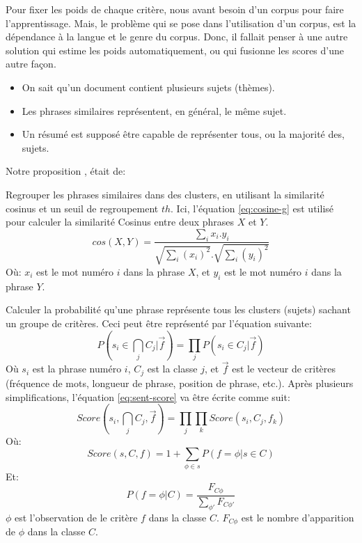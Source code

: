 \documentclass[12pt, oneside, a4paper]{book}
\begin{document}
Pour fixer les poids de chaque critère, nous avant besoin d'un corpus pour faire l'apprentissage.
Mais, le problème qui se pose dans l'utilisation d'un corpus, est la dépendance à la langue et le genre du corpus.
Donc, il fallait penser à une autre solution qui estime les poids automatiquement, ou qui fusionne les scores d'une autre façon.
\begin{itemize}
\item On sait qu'un document contient plusieurs sujets (thèmes).
\item Les phrases similaires représentent, en général, le même sujet.
\item Un résumé est supposé être capable de représenter tous, ou la majorité des, sujets.
\end{itemize}
Notre proposition \cite{13-aries-al}, était de:

\noindent
Regrouper les phrases similaires dans des clusters, en utilisant la similarité cosinus et un seuil de regroupement $ th $.
Ici, l'équation \ref{eq:cosine-g} est utilisé pour calculer la similarité Cosinus entre deux phrases $ X $ et $ Y $.
\begin{equation}
\label{eq:cosine-g}
cos(X,Y) = \frac {\sum_i {x_i.y_i} }
{\sqrt{\sum_i(x_i)^2} . \sqrt{\sum_i(y_i)^2}}
\end{equation}
Où: $ x_i $ est le mot numéro $ i $ dans la phrase $ X $, et $ y_i $ est le mot numéro $ i $ dans la phrase $ Y $.

\noindent
Calculer la probabilité qu'une phrase représente tous les clusters (sujets) sachant un groupe de critères.
Ceci peut être représenté par l'équation suivante: 
\begin{equation}
\label{eq:sent-score}
P(s_i \in \bigcap_{j} C_j | \overrightarrow{f}) = 
\prod_{j} P(s_i \in C_j | \overrightarrow{f})
\end{equation}
Où $s_i$ est la phrase numéro $i$, $C_j$ est la classe $j$, et $\overrightarrow{f}$ est le vecteur de critères (fréquence de mots, longueur de phrase, position de phrase, etc.).
Après plusieurs simplifications, l'équation \ref{eq:sent-score} va être écrite comme suit:
\begin{equation}
\label{eq:class-score}
Score(s_i , \bigcap_{j} C_j , \overrightarrow{f}) = 
\prod_{j} \prod_{k} Score(s_i , C_j , f_k )
\end{equation}
Où:
\begin{equation}
\label{eq:score}
Score(s , C , f ) = 1 + \sum_{\phi \in s} {P(f=\phi | s \in C)}
\end{equation}
Et:
\begin{equation}
\label{eq:likelihood}
P(f = \phi | C) = \frac {F_{C\phi}}{\sum_{\phi'}{F_{C\phi'}}}
\end{equation}
$\phi$ est l'observation de le critère $ f $ dans la classe $ C $. 
$F_{C\phi}$ est le nombre d'apparition de $\phi$ dans la classe $ C $.
\end{document}
